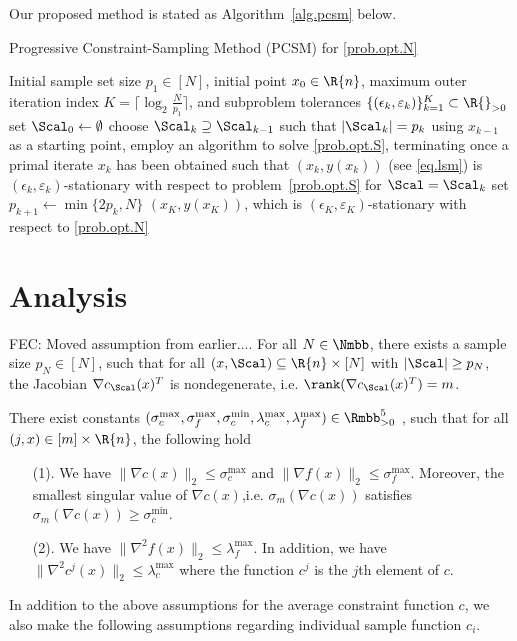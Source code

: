 Our proposed method is stated as Algorithm~\ref{alg.pcsm} below.

\balgorithm
  \caption{Progressive Constraint-Sampling Method (PCSM) for \eqref{prob.opt.N}}
  \label{alg.pcsm}
  \balgorithmic[1]
    \Require Initial sample set size $p_1 \in [N]$, initial point $x_0 \in \R{n}$, maximum outer iteration index $K = \lceil \log_2 \frac{N}{p_1} \rceil$, and subproblem tolerances $\{(\epsilon_k,\varepsilon_k)\}_{k=1}^K \subset \R{}_{>0}$
    \State set $\Scal_0 \gets \emptyset$
      \State choose $\Scal_k \supseteq \Scal_{k-1}$ such that $|\Scal_k| = p_k$
      \State using $x_{k-1}$ as a starting point, employ an algorithm to solve \eqref{prob.opt.S}, terminating once a primal iterate $x_k$ has been obtained such that $(x_k,y(x_k))$ (see \eqref{eq.lsm}) is $(\epsilon_k,\varepsilon_k)$-stationary with respect to problem~\eqref{prob.opt.S} for $\Scal = \Scal_k$
      \State set $p_{k+1} \gets \min\{2p_k, N\}$
    \EndFor
    \State \Return $(x_K,y(x_K))$, which is $(\epsilon_K,\varepsilon_K)$-stationary with respect to \eqref{prob.opt.N}
  \ealgorithmic
\ealgorithm

\section{Analysis}\label{sec.analysis}

FEC: Moved assumption from earlier....
\bassumption\label{ass.nondegeneracy}
  For all $N\in \Nmbb$, there exists a sample size $p_N\in[N]$, such that for all $(x,\Scal)\subseteq\R{n}\times[N]$ with $|\Scal|\ge p_N$, the Jacobian $\nabla c_{\Scal}(x)^T$ is nondegenerate, i.e. $\rank(\nabla c_{\Scal}(x)^T)=m$.
\eassumption

\bassumption
 \label{ass.boundness}
 There exist constants $(
  \sigma_{c}^{\max},\sigma_f^{\max}, 
\sigma_c^{\min},\lambda_c^{\max}
 ,\lambda_f^{\max}
 )\in\Rmbb_{>0}^5$ 
, such that for all $(j,x)\in[m]\times\R{n}$, the following hold
 \begin{itemize}
 	\item[(1).]
 	We have $\|\nabla c(x)\|_2\le\sigma_c^{\max}$ and $\|\nabla f(x)\|_2\le\sigma_f^{\max}$. Moreover, the smallest singular value of $\nabla c(x)$,i.e. $\sigma_m(\nabla c (x))$ satisfies $\sigma_m(\nabla c (x))\ge \sigma_c^{\min}$. 
 	\item[(2).] 
 	We have $\|\nabla^2 f(x)\|_2\le\lambda_f^{\max}$. In addition, we have $\|\nabla^2 c^j(x)\|_2\le\lambda_c^{\max}$ where the function $c^j$ is the $j$th element of $c$. %
 \end{itemize} 
\eassumption
  In addition to the above assumptions for the average constraint function $c$, we also make the following assumptions regarding individual sample function $c_i$.
  
